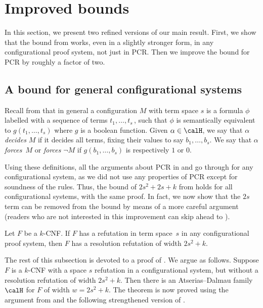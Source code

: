 \documentclass{toc}
\begin{document}
%
\section{Improved bounds}\label{sec:refinements}
%

In this section, we present two refined versions of our main result. 
First, we show that the bound from  
works, even in a slightly stronger form,
in any configurational proof system, not just in PCR.
Then we improve the bound for PCR by roughly a factor of two.


\subsection{A bound for general configurational systems}

Recall from  that in general
 a configuration $M$ with term space $s$ is a formula $\phi$ labelled
with a sequence of terms $t_1, \dots, t_s$\,,
such that $\phi$ is semantically equivalent to $g(t_1, \dots, t_s)$ 
where $g$ is a boolean function. Given $\alpha \in \calH$,
we say that $\alpha$ \emph{decides} $M$ if it decides all terms,
fixing their values to say $b_1, \dots, b_s$.
We say that $\alpha$ \emph{forces}~$M$ or \emph{forces} $\neg M$
 if $g(b_1, \dots, b_s)$ is respectively $1$ or $0$.
 
Using these definitions, all the arguments about PCR  in 
 and 
go through for any configurational system, 
as we did not use any properties of PCR except for soundness of the rules. 
Thus, the bound of $2s^2 + 2s  + k$ from  holds for all configurational systems, with the same proof.
In fact, we now show that the $2s$ term can be removed from the bound by means
of a more careful argument
(readers who are not interested in this improvement 
can skip ahead to ).

\begin{theorem} \label{the:configurational_bound}
Let $F$ be a $k$-CNF. If $F$ has a refutation in term space~$s$
in any configurational proof system, then $F$
has a resolution refutation of width $2s^2 + k$.
\end{theorem}



The rest of this subsection is devoted to a proof of . 
We argue as follows. Suppose $F$ is a $k$-CNF with a space $s$ refutation in a configurational
system, but without a resolution refutation of width $2s^2+k$.
Then there is an Atserias--Dalmau family~$\calH$ for $F$ of width $w = 2s^2+k$.
The theorem is now proved using the argument from 
and the following strengthened version of .
\end{document}
